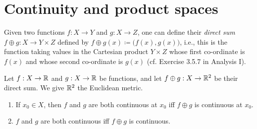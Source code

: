 \section{Continuity and product spaces}\label{ii:sec:2.2}

\begin{note}
  Given two functions \(f : X \to Y\) and \(g : X \to Z\), one can define their \emph{direct sum} \(f \oplus g : X \to Y \times Z\) defined by \(f \oplus g(x) \coloneqq \big(f(x), g(x)\big)\), i.e., this is the function taking values in the Cartesian product \(Y \times Z\) whose first co-ordinate is \(f(x)\) and whose second co-ordinate is \(g(x)\)
  (cf. Exercise 3.5.7 in Analysis I).
\end{note}

\begin{lem}\label{ii:2.2.1}
  Let \(f : X \to \mathbb{R}\) and \(g : X \to \mathbb{R}\) be functions, and let \(f \oplus g : X \to \mathbb{R}^2\) be their direct sum.
  We give \(\mathbb{R}^2\) the Euclidean metric.
  \begin{enumerate}
    \item If \(x_0 \in X\), then \(f\) and \(g\) are both continuous at \(x_0\) iff \(f \oplus g\) is continuous at \(x_0\).
    \item \(f\) and \(g\) are both continuous iff \(f \oplus g\) is continuous.
  \end{enumerate}
\end{lem}

